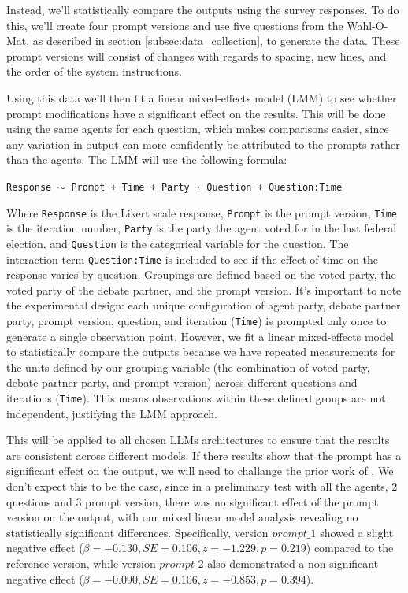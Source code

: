 \documentclass[12pt]{article}
\begin{document}
\begin{multicols}{2}
Instead, we'll statistically compare the outputs using the survey responses. To do this, we'll create four prompt versions and use five questions from the Wahl-O-Mat, as described in section \ref{subsec:data_collection}, to generate the data. These prompt versions will consist of changes with regards to spacing, new lines, and the order of the system instructions. 
 
Using this data we'll then fit a linear mixed-effects model (LMM) to see whether prompt modifications have a significant effect on the results. This will be done using the same agents for each question, which makes comparisons easier, since any variation in output can more confidently be attributed to the prompts rather than the agents. The LMM will use the following formula:

\texttt{Response $\sim$ Prompt + Time + Party + Question + Question:Time}

Where \texttt{Response} is the Likert scale response, \texttt{Prompt} is the prompt version, \texttt{Time} is the iteration number, \texttt{Party} is the party the agent voted for in the last federal election, and \texttt{Question} is the categorical variable for the question. The interaction term \texttt{Question:Time} is included to see if the effect of time on the response varies by question. Groupings are defined based on the voted party, the voted party of the debate partner, and the prompt version. It's important to note the experimental design: each unique configuration of agent party, debate partner party, prompt version, question, and iteration (\texttt{Time}) is prompted only once to generate a single observation point. However, we fit a linear mixed-effects model to statistically compare the outputs because we have repeated measurements for the units defined by our grouping variable (the combination of voted party, debate partner party, and prompt version) across different questions and iterations (\texttt{Time}). This means observations within these defined groups are not independent, justifying the LMM approach.

This will be applied to all chosen LLMs architectures to ensure that the results are consistent across different models. If there results show that the prompt has a significant effect on the output, we will need to challange the prior work of . We don't expect this to be the case, since in a preliminary test with all the agents, 2 questions and 3 prompt version, there was no significant effect of the prompt version on the output, with our mixed linear model analysis revealing no statistically significant differences. Specifically, version $prompt\_1$ showed a slight negative effect ($\beta = -0.130, SE = 0.106, z = -1.229, p = 0.219$) compared to the reference version, while version $prompt\_2$ also demonstrated a non-significant negative effect ($\beta = -0.090, SE = 0.106, z = -0.853, p = 0.394$). 


\end{multicols}
\end{document}
